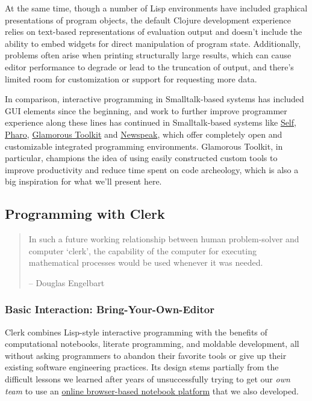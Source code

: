 \documentclass[
]{article}
\begin{document}
At the same time, though a number of Lisp environments have included graphical presentations of program objects, the default Clojure development experience relies on text-based representations of evaluation output and doesn't include the ability to embed widgets for direct manipulation of program state. Additionally, problems often arise when printing structurally large results, which can cause editor performance to degrade or lead to the truncation of output, and there's limited room for customization or support for requesting more data.

In comparison, interactive programming in Smalltalk-based systems has included GUI elements since the beginning, and work to further improve programmer experience along these lines has continued in Smalltalk-based systems like \href{https://selflanguage.org}{Self}, \href{https://pharo.org}{Pharo}, \href{https://gtoolkit.com}{Glamorous Toolkit} and \href{https://newspeaklanguage.org}{Newspeak}, which offer completely open and customizable integrated programming environments. Glamorous Toolkit, in particular, champions the idea of using easily constructed custom tools to improve productivity and reduce time spent on code archeology, which is also a big inspiration for what we'll present here.

\hypertarget{id}{%
\subsection{Programming with Clerk}\label{id}}

\begin{quote}
In such a future working relationship between human problem-solver and computer `clerk', the capability of the computer for executing mathematical processes would be used whenever it was needed.

-- Douglas Engelbart
\end{quote}

\hypertarget{id}{%
\subsubsection{Basic Interaction: Bring-Your-Own-Editor}\label{id}}

Clerk combines Lisp-style interactive programming with the benefits of computational notebooks, literate programming, and moldable development, all without asking programmers to abandon their favorite tools or give up their existing software engineering practices. Its design stems partially from the difficult lessons we learned after years of unsuccessfully trying to get our \emph{own team} to use an \href{https://nextjournal.com}{online browser-based notebook platform} that we also developed.
\end{document}

